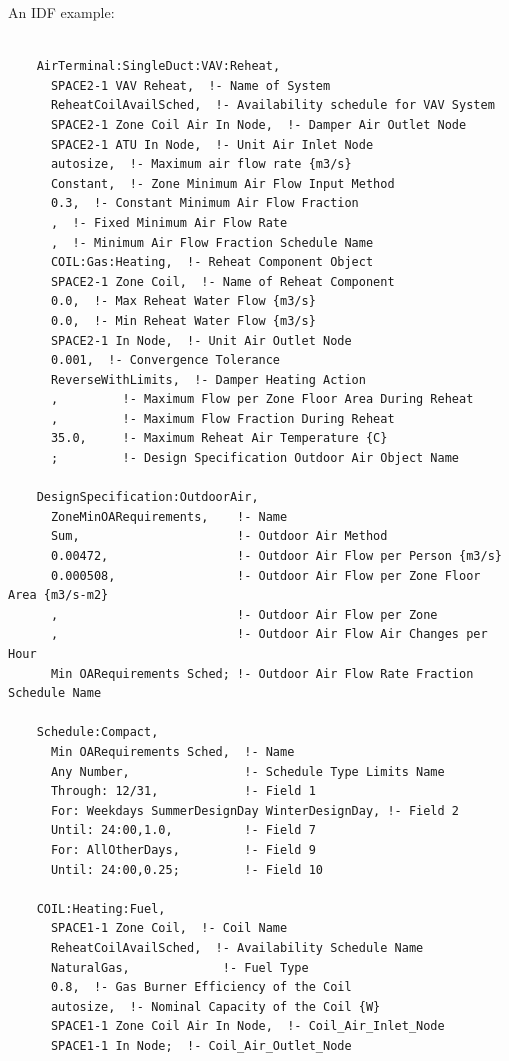 An IDF example:

\begin{lstlisting}

    AirTerminal:SingleDuct:VAV:Reheat,
      SPACE2-1 VAV Reheat,  !- Name of System
      ReheatCoilAvailSched,  !- Availability schedule for VAV System
      SPACE2-1 Zone Coil Air In Node,  !- Damper Air Outlet Node
      SPACE2-1 ATU In Node,  !- Unit Air Inlet Node
      autosize,  !- Maximum air flow rate {m3/s}
      Constant,  !- Zone Minimum Air Flow Input Method
      0.3,  !- Constant Minimum Air Flow Fraction
      ,  !- Fixed Minimum Air Flow Rate
      ,  !- Minimum Air Flow Fraction Schedule Name
      COIL:Gas:Heating,  !- Reheat Component Object
      SPACE2-1 Zone Coil,  !- Name of Reheat Component
      0.0,  !- Max Reheat Water Flow {m3/s}
      0.0,  !- Min Reheat Water Flow {m3/s}
      SPACE2-1 In Node,  !- Unit Air Outlet Node
      0.001,  !- Convergence Tolerance
      ReverseWithLimits,  !- Damper Heating Action
      ,         !- Maximum Flow per Zone Floor Area During Reheat
      ,         !- Maximum Flow Fraction During Reheat
      35.0,     !- Maximum Reheat Air Temperature {C}
      ;         !- Design Specification Outdoor Air Object Name

    DesignSpecification:OutdoorAir,
      ZoneMinOARequirements,    !- Name
      Sum,                      !- Outdoor Air Method
      0.00472,                  !- Outdoor Air Flow per Person {m3/s}
      0.000508,                 !- Outdoor Air Flow per Zone Floor Area {m3/s-m2}
      ,                         !- Outdoor Air Flow per Zone
      ,                         !- Outdoor Air Flow Air Changes per Hour
      Min OARequirements Sched; !- Outdoor Air Flow Rate Fraction Schedule Name

    Schedule:Compact,
      Min OARequirements Sched,  !- Name
      Any Number,                !- Schedule Type Limits Name
      Through: 12/31,            !- Field 1
      For: Weekdays SummerDesignDay WinterDesignDay, !- Field 2
      Until: 24:00,1.0,          !- Field 7
      For: AllOtherDays,         !- Field 9
      Until: 24:00,0.25;         !- Field 10

    COIL:Heating:Fuel,
      SPACE1-1 Zone Coil,  !- Coil Name
      ReheatCoilAvailSched,  !- Availability Schedule Name
      NaturalGas,             !- Fuel Type
      0.8,  !- Gas Burner Efficiency of the Coil
      autosize,  !- Nominal Capacity of the Coil {W}
      SPACE1-1 Zone Coil Air In Node,  !- Coil_Air_Inlet_Node
      SPACE1-1 In Node;  !- Coil_Air_Outlet_Node
\end{lstlisting}


